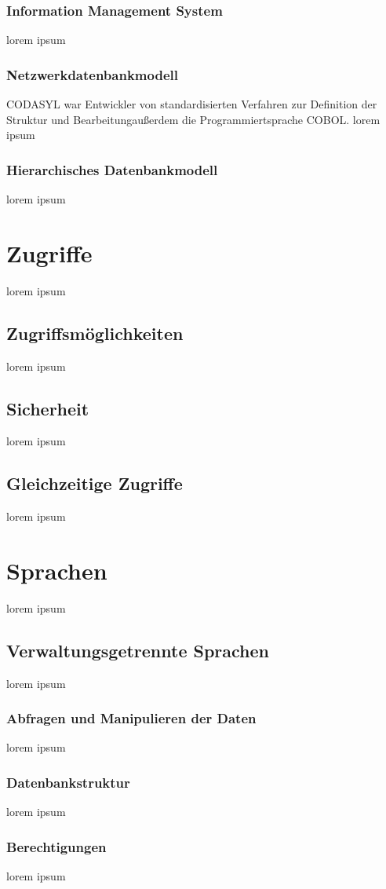 \documentclass[11pt,a4paper]{report}
\begin{document}
\subsubsection{Information Management System}
lorem ipsum
\subsubsection{Netzwerkdatenbankmodell}
CODASYL war Entwickler von standardisierten Verfahren zur Definition der Struktur und Bearbeitungaußerdem die Programmiertsprache COBOL. 
lorem ipsum
\subsubsection{Hierarchisches Datenbankmodell}
lorem ipsum
\section{Zugriffe}
lorem ipsum
\subsection{Zugriffsmöglichkeiten}
lorem ipsum
\subsection{Sicherheit}
lorem ipsum
\subsection{Gleichzeitige Zugriffe}
lorem ipsum 
\section{Sprachen}
lorem ipsum
\subsection{Verwaltungsgetrennte Sprachen}
lorem ipsum
\subsubsection{Abfragen und Manipulieren der Daten}
lorem ipsum
\subsubsection{Datenbankstruktur}
lorem ipsum
\subsubsection{Berechtigungen}
lorem ipsum
\end{document}
